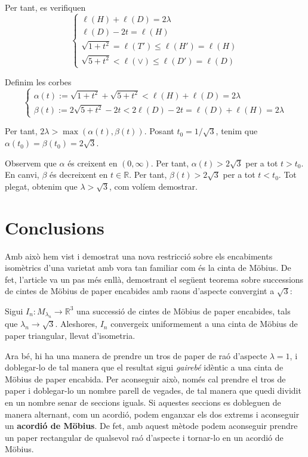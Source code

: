 Per tant, es verifiquen
\begin{equation*}
    \begin{cases}
        \ell(H) + \ell(D) = 2\lambda\\
        \ell(D)-2t=\ell(H)\\
        \sqrt{1+t^2}=\ell(T')\le\ell(H')=\ell(H)\\
        \sqrt{5+t^2}<\ell(\lor)\le\ell(D')=\ell(D)
    \end{cases}
\end{equation*}

Definim les corbes
\begin{equation*}
    \begin{cases}
        \alpha(t) := \sqrt{1+t^2} + \sqrt{5+t^2}<\ell(H) + \ell(D) = 2\lambda\\
        \beta(t) := 2\sqrt{5+t^2}-2t < 2\ell(D)-2t = \ell(D) + \ell(H) = 2\lambda
    \end{cases}
\end{equation*}

Per tant, $2\lambda > \max(\alpha(t),\beta(t))$. Posant $t_0 = 1/\sqrt{3}$, tenim que $\alpha(t_0) = \beta(t_0) = 2\sqrt3$.

Observem que $\alpha$ és creixent en $(0,\infty)$. Per tant, $\alpha(t)>2\sqrt3$ per a tot $t>t_0$. En canvi, $\beta$ és decreixent en $t\in\mathbb R$. Per tant, $\beta(t)>2\sqrt3$ per a tot $t<t_0$. Tot plegat, obtenim que $\lambda>\sqrt3$, com volíem demostrar.

\section{Conclusions}
Amb això hem vist i demostrat una nova restricció sobre els encabiments isomètrics d'una varietat amb vora tan familiar com és la cinta de Möbius. De fet, l'article \cite{schwartz2024} va un pas més enllà, demostrant el següent teorema sobre successions de cintes de Möbius de paper encabides amb raons d'aspecte convergint a $\sqrt{3}$:

\begin{teo}\label{teo:Límit triangular}
    Sigui $I_n:M_{\lambda_n}\to\mathbb R^3$ una successió de cintes de Möbius de paper encabides, tals que $\lambda_n\to\sqrt{3}$. Aleshores, $I_n$ convergeix uniformement a una cinta de Möbius de paper triangular, llevat d'isometria.
\end{teo}

Ara bé, hi ha una manera de prendre un tros de paper de raó d'aspecte $\lambda = 1$, i doblegar-lo de tal manera que el resultat sigui \textit{gairebé} idèntic a una cinta de Möbius de paper encabida. Per aconseguir això, només cal prendre el tros de paper i doblegar-lo un nombre parell de vegades, de tal manera que quedi dividit en un nombre senar de seccions iguals. Si aquestes seccions es dobleguen de manera alternant, com un acordió, podem enganxar els dos extrems i aconseguir un \textbf{acordió de Möbius}. De fet, amb aquest mètode podem aconseguir prendre un paper rectangular de qualsevol raó d'aspecte i tornar-lo en un acordió de Möbius. 

